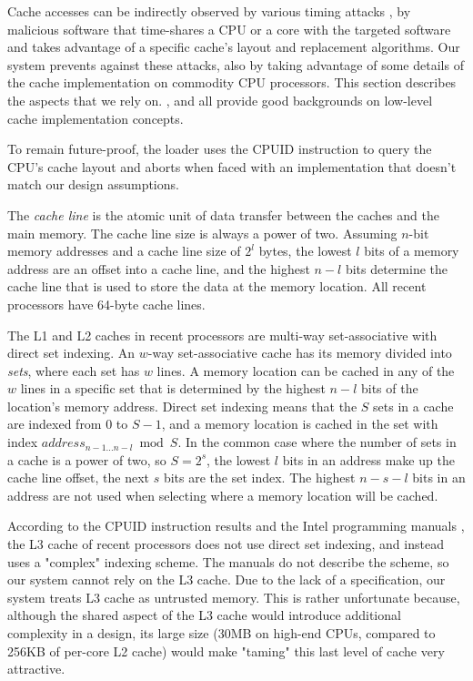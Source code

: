 Cache accesses can be indirectly observed by various timing attacks
\cite{banescu2011cache}, by malicious software that time-shares a CPU or a core
with the targeted software and takes advantage of a specific cache's layout
and replacement algorithms. Our system prevents against these attacks, also by
taking advantage of some details of the cache implementation on commodity CPU
processors. This section describes the aspects that we rely on.
\cite{smith1982cache}, \cite{patterson2013architecture} and
\cite{hennessy2012architecture} all provide good backgrounds on low-level cache
implementation concepts.

To remain future-proof, the loader uses the CPUID instruction
\cite{intel2013manual} to query the CPU's cache layout and aborts when faced
with an implementation that doesn't match our design assumptions.

The \textit{cache line} is the atomic unit of data transfer between the caches
and the main memory. The cache line size is always a power of two. Assuming
$n$-bit memory addresses and a cache line size of $2^{l}$ bytes, the lowest
$l$ bits of a memory address are an offset into a cache line, and the highest
$n - l$ bits determine the cache line that is used to store the data at the
memory location. All recent processors have 64-byte cache lines.

The L1 and L2 caches in recent processors are multi-way set-associative with
direct set indexing. An $w$-way set-associative cache has its memory divided
into \textit{sets}, where each set has $w$ lines. A memory location can be
cached in any of the $w$ lines in a specific set that is determined by the
highest $n - l$ bits of the location's memory address. Direct set indexing
means that the $S$ sets in a cache are indexed from $0$ to $S - 1$, and a
memory location is cached in the set with index
$address_{n - 1 \ldots n - l} \bmod S$. In the common case where the number of
sets in a cache is a power of two, so $S = 2^{s}$, the lowest $l$ bits in an
address make up the cache line offset, the next $s$ bits are the set index.
The highest $n - s - l$ bits in an address are not used when selecting where a
memory location will be cached.

According to the CPUID instruction results and the Intel programming manuals
\cite{intel2013manual}, the L3 cache of recent processors does not use direct
set indexing, and instead uses a "complex" indexing scheme. The manuals do not
describe the scheme, so our system cannot rely on the L3 cache. Due to the lack
of a specification, our system treats L3 cache as untrusted memory. This is
rather unfortunate because, although the shared aspect of the L3 cache would
introduce additional complexity in a design, its large size (30MB on high-end
CPUs, compared to 256KB of per-core L2 cache) would make "taming" this last
level of cache very attractive.

